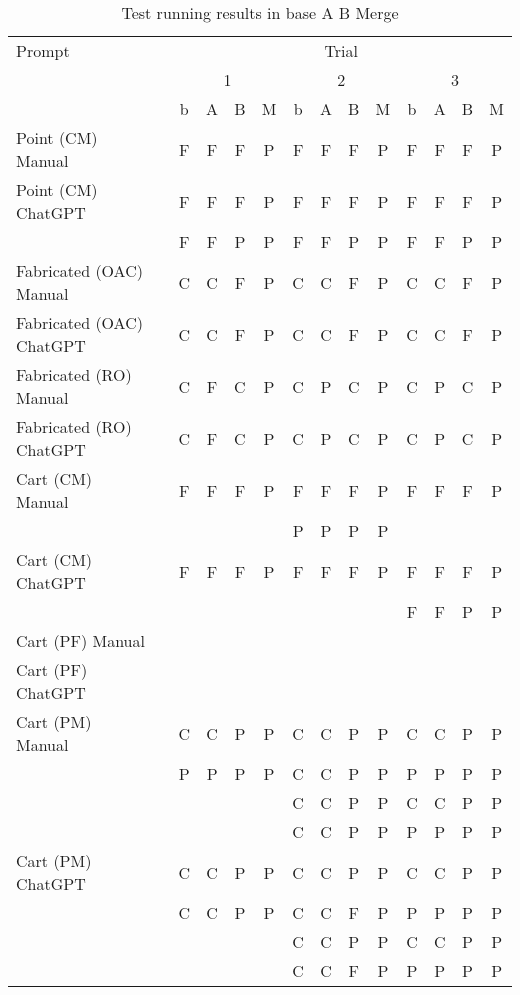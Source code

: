 \begin{table}[t]
    \centering
    \begin{tabular}{@{\extracolsep{\fill}} llcccccccccccc} 
        \toprule
        Prompt & & \multicolumn{12}{c}{Trial} \\ 
        \cmidrule(lr){3-14}
        & & \multicolumn{4}{c}{1} & \multicolumn{4}{c}{2} & \multicolumn{4}{c}{3} \\ 
                            & & b & A & B & M & b & A & B & M & b & A & B & M \\ 
\midrule
Point (CM) Manual           & & F & F & F & P & F & F & F & P & F & F & F & P \\ 
Point (CM) ChatGPT          & & F & F & F & P & F & F & F & P & F & F & F & P \\ 
                            & & F & F & P & P & F & F & P & P & F & F & P & P \\ 
Fabricated (OAC) Manual     & & C & C & F & P & C & C & F & P & C & C & F & P \\ 
Fabricated (OAC) ChatGPT    & & C & C & F & P & C & C & F & P & C & C & F & P \\ 
Fabricated (RO) Manual      & & C & F & C & P & C & P & C & P & C & P & C & P \\ 
Fabricated (RO) ChatGPT     & & C & F & C & P & C & P & C & P & C & P & C & P \\
Cart (CM) Manual            & & F & F & F & P & F & F & F & P & F & F & F & P \\ 
                            & &   &   &   &   & P & P & P & P &   &   &   &   \\ 
Cart (CM) ChatGPT           & & F & F & F & P & F & F & F & P & F & F & F & P \\ %
                            & &   &   &   &   &   &   &   &   & F & F & P & P \\ 
Cart (PF) Manual            & &  &  &  &  &  &  &  &  &  &  &  &  \\ 
Cart (PF) ChatGPT           & &  &  &  &  &  &  &  &  &  &  &  &  \\ 
Cart (PM) Manual            & & C & C & P & P & C & C & P & P & C & C & P & P \\ 
                            & & P & P & P & P & C & C & P & P & P & P & P & P \\ 
                            & &   &   &   &   & C & C & P & P & C & C & P & P \\ 
                            & &   &   &   &   & C & C & P & P & P & P & P & P \\ 
Cart (PM) ChatGPT           & & C & C & P & P & C & C & P & P & C & C & P & P \\
                            & & C & C & P & P & C & C & F & P & P & P & P & P \\
                            & &   &   &   &   & C & C & P & P & C & C & P & P \\
                            & &   &   &   &   & C & C & F & P & P & P & P & P \\
        \bottomrule
    \end{tabular}
    \caption{Test running results in base A B Merge \label{tab:results:rq2tests}}
\end{table}
